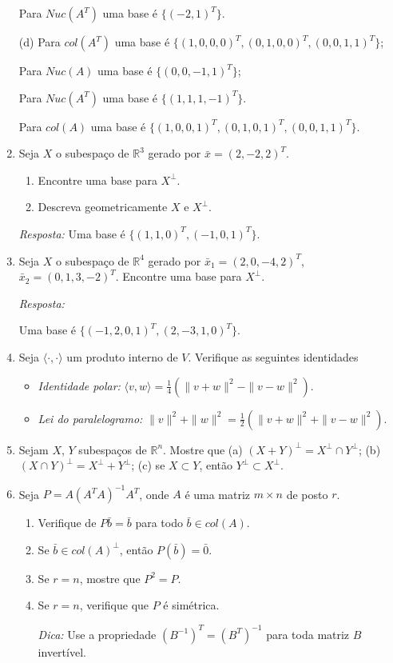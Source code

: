 \documentclass[10pt]{article}
\theoremstyle{plain}
\theoremstyle{obs}
\numberwithin{equation}{section}
\begin{document}
\begin{enumerate}
 Para $Nuc(A^{T})$ uma base é $\{(-2,1)^{T}\}$.
    
 (d) Para $col(A^{T})$ uma base é 
    $\{(1,0,0,0)^{T}, (0,1,0,0)^{T}, (0,0,1,1)^{T}\}$;
     
     Para $Nuc(A)$ uma base é $\{(0,0,-1,1)^{T}\}$;
     
     Para $Nuc(A^{T})$ uma base é 
     $\{(1,1,1,-1)^{T}\}$.
     
     Para $col(A)$ uma base é 
     $\{(1,0,0,1)^{T}, (0,1,0,1)^{T}, (0,0,1,1)^{T}\}$.
     
 \item Seja $X$ o subespaço de $\mathbb{R}^{3}$ gerado por $\bar{x}=(2,-2,2)^{T}$.
    \begin{enumerate}
     \item Encontre uma base para $X^{\perp}$.    
     \item Descreva geometricamente $X$ e $X^{\perp}$.
     \end{enumerate}
 {\it Resposta:} Uma base é 
 $\{(1,1,0)^{T},(-1,0,1)^{T}\}$.
 \item Seja $X$ o subespaço de $\mathbb{R}^{4}$ gerado por $\bar{x}_1=(2,0,-4,2)^{T}$, 
  $\bar{x}_2=(0,1,3,-2)^{T}$. Encontre uma base para $X^{\perp}$.    
  
  {\it Resposta:} 
  
  Uma base é $\{(-1,2,0,1)^{T},(2,-3,1,0)^{T}\}$.
  
  \item Seja $\langle \cdot, \cdot \rangle$ um produto interno de $V$. 
  Verifique as seguintes identidades
    \begin{itemize}
     \item {\it Identidade polar: }
     $\langle v, w\rangle=\frac{1}{4}(\|v+w\|^{2}-\|v-w\|^{2})$.
     \item {\it Lei do paralelogramo: }
     $\|v\|^{2}+\|w\|^{2}=\frac{1}{2}(\|v+w\|^{2}+\|v-w\|^{2})$.
    \end{itemize}

  \item Sejam $X$, $Y$ subespaços de $\mathbb{R}^{n}$.
  Mostre que (a) $(X+Y)^{\perp}=X^{\perp}\cap Y^{\perp}$; 
  (b) $(X\cap Y)^{\perp}=X^{\perp}+Y^{\perp}$; (c) se $X \subset Y$, então 
  $Y^{\perp} \subset X^{\perp}$.
  
  \item Seja $P=A(A^{T}A)^{-1}A^{T}$, onde $A$ é uma matriz $m\times n$ 
  de posto $r$.
    \begin{enumerate}
     \item Verifique de $P \bar{b}=\bar{b}$ para todo $\bar{b} \in col(A)$.
     \item Se $\bar{b} \in col(A)^{\perp}$, então $P(\bar{b})=\bar{0}$.
     \item Se $r=n$, mostre que $P^{2}=P$.
     \item Se $r=n$, verifique que $P$ é simétrica. 
     
     {\it Dica:} Use a propriedade 
     $(B^{-1})^{T}=(B^{T})^{-1}$ para toda matriz $B$ invertível.
    \end{enumerate}

  \end{enumerate}
\end{document}

